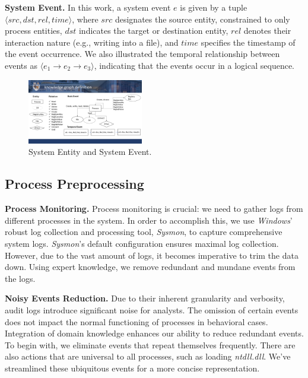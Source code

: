 \noindent
{\bf System Event.} In this work, a system event $e$ is given by a tuple $\langle src, dst, rel, time\rangle$, where $src$ designates the source entity, constrained to only process entities, $dst$ indicates the target or destination entity, $rel$ denotes their interaction nature (e.g., writing into a file), and $time$ specifies the timestamp of the event occurrence.
We also illustrated the temporal relationship between events as $\langle e_1 \to e_2 \to e_3 \rangle$, indicating that the events occur in a logical sequence. 



\begin{figure}[ht]
    \centering
      \includegraphics[width=0.45\textwidth]{figs/entity.pdf}
    \caption{System Entity and System Event.}
    \label{fig-entity}
\end{figure}

\subsection{Process Preprocessing}
\noindent
{\bf Process Monitoring.} 
Process monitoring is crucial: we need to gather logs from different processes in the system. In order to accomplish this, we use \textit{Windows}' robust log collection and processing tool, \textit{Sysmon}, to capture comprehensive system logs. \textit{Sysmon}'s default configuration ensures maximal log collection. 
However, due to the vast amount of logs, it becomes imperative to trim the data down. Using expert knowledge, we remove redundant and mundane events from the logs.

\noindent
{\bf Noisy Events Reduction.} 
Due to their inherent granularity and verbosity, audit logs introduce significant noise for analysts.
The omission of certain events does not impact the normal functioning of processes in behavioral cases. Integration of domain knowledge enhances our ability to reduce redundant events. 
To begin with, we eliminate events that repeat themselves frequently.
There are also actions that are universal to all processes, such as loading \textit{ntdll.dll}. We've streamlined these ubiquitous events for a more concise representation.

